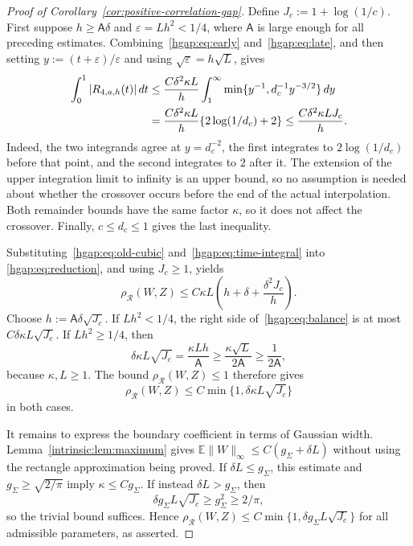 \documentclass[11pt,letterpaper]{article}
\theoremstyle{remark}
\newcommand{\E}{\mathbb E}
\newcommand{\rh}{\rho_{\mathcal R}}
\newcommand{\dd}{\,d}
\begin{document}
\begin{proof}[Proof of Corollary~\ref{cor:positive-correlation-gap}]
Define $J_c:=1+\log(1/c)$. First suppose $h\ge\mathsf A\delta$ and
$\varepsilon=Lh^2<1/4$, where $\mathsf A$ is large enough for all preceding estimates.
Combining~\eqref{hgap:eq:early} and~\eqref{hgap:eq:late}, and then setting
$y:=(t+\varepsilon)/\varepsilon$ and using
$\sqrt\varepsilon=h\sqrt L$, gives
\begin{align}
 \int_0^1|R_{4,a,h}(t)|\dd t
 &\le\frac{C\delta^2\kappa L}h
    \int_1^\infty\min\{y^{-1},d_c^{-1}y^{-3/2}\}\dd y\notag\\
 &=\frac{C\delta^2\kappa L}h
                      \{2\log(1/d_c)+2\}
 \le\frac{C\delta^2\kappa LJ_c}{h}.              \label{hgap:eq:time-integral}
\end{align}
Indeed, the two integrands agree at $y=d_c^{-2}$, the first integrates
to $2\log(1/d_c)$ before that point, and the second integrates to $2$
after it. The extension of the upper integration limit to infinity
is an upper bound, so no assumption is needed about whether the
crossover occurs before the end of the actual interpolation.
Both remainder bounds have the same factor $\kappa$, so it does not
affect the crossover. Finally, $c\le d_c\le1$ gives the last inequality.

Substituting~\eqref{hgap:eq:old-cubic} and~\eqref{hgap:eq:time-integral} into
\eqref{hgap:eq:reduction}, and using $J_c\ge1$, yields
\begin{equation}\label{hgap:eq:balance}
 \rh(W,Z)\le C\kappa L\left(h+\delta+\frac{\delta^2J_c}{h}\right).
\end{equation}
Choose $h:=\mathsf A\delta\sqrt{J_c}$. If $Lh^2<1/4$, the right
side of~\eqref{hgap:eq:balance} is at most $C\delta\kappa L\sqrt{J_c}$.
If $Lh^2\ge1/4$, then
\[
 \delta\kappa L\sqrt{J_c}
 =\frac{\kappa Lh}{\mathsf A}
 \ge\frac{\kappa\sqrt L}{2\mathsf A}\ge\frac1{2\mathsf A},
\]
because $\kappa,L\ge1$. The bound $\rh(W,Z)\le1$ therefore gives
\[
 \rh(W,Z)\le C\min\{1,\delta\kappa L\sqrt{J_c}\}
\]
in both cases.

It remains to express the boundary coefficient in terms of Gaussian
width. Lemma~\ref{intrinsic:lem:maximum} gives
$\E\|W\|_\infty\le C(g_\Sigma+\delta L)$ without using the rectangle
approximation being proved. If $\delta L\le g_\Sigma$, this estimate
and $g_\Sigma\ge\sqrt{2/\pi}$ imply $\kappa\le Cg_\Sigma$.
If instead $\delta L>g_\Sigma$, then
\[
 \delta g_\Sigma L\sqrt{J_c}\ge g_\Sigma^2\ge2/\pi,
\]
so the trivial bound suffices. Hence
$\rh(W,Z)\le C\min\{1,\delta g_\Sigma L\sqrt{J_c}\}$ for all
admissible parameters, as asserted.
\end{proof}
\end{document}

